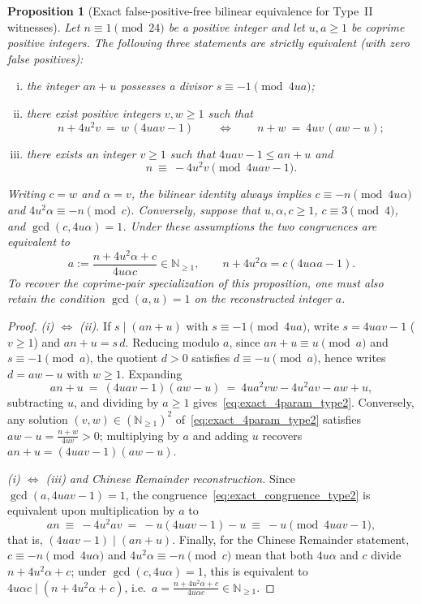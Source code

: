 \documentclass[11pt, a4paper]{article}
\theoremstyle{plain}
\newtheorem{proposition}[theorem]{Proposition}
\theoremstyle{definition}
\newcommand{\N}{\mathbb{N}}
\begin{document}
\begin{proposition}[Exact false-positive-free bilinear equivalence for Type~II witnesses]\label{prop:exact_bilinear_type2}\label{prop:exact_monomial_decoupling}
Let $n\equiv1\pmod{24}$ be a positive integer and let $u,a\ge1$ be coprime positive integers. The following three statements are strictly equivalent (with zero false positives):
\begin{enumerate}[(i)]
    \item the integer $an+u$ possesses a divisor $s\equiv-1\pmod{4ua}$;
    \item there exist positive integers $v,w\ge1$ such that
    \begin{equation}\label{eq:exact_4param_type2}
    n+4u^{2}v\ =\ w\,(4uav-1)\qquad\Longleftrightarrow\qquad n+w\ =\ 4uv\,(aw-u);
    \end{equation}
    \item there exists an integer $v\ge1$ such that $4uav-1\le an+u$ and
    \begin{equation}\label{eq:exact_congruence_type2}
    n\ \equiv\ -4u^{2}v\pmod{4uav-1}.
    \end{equation}
\end{enumerate}
Writing $c=w$ and $\alpha=v$, the bilinear identity always implies $c\equiv-n\pmod{4u\alpha}$ and $4u^{2}\alpha\equiv-n\pmod c$. Conversely, suppose that $u,\alpha,c\ge1$, $c\equiv3\pmod 4$, and $\gcd(c,4u\alpha)=1$. Under these assumptions the two congruences are equivalent to
\[
a:=\frac{n+4u^{2}\alpha+c}{4u\alpha c}\in\N_{\ge1},\qquad n+4u^{2}\alpha=c(4u\alpha a-1).
\]
To recover the coprime-pair specialization of this proposition, one must also retain the condition $\gcd(a,u)=1$ on the reconstructed integer $a$.
\end{proposition}
\begin{proof}
\emph{(i) $\Longleftrightarrow$ (ii).} If $s\mid(an+u)$ with $s\equiv-1\pmod{4ua}$, write $s=4uav-1$ ($v\ge1$) and $an+u=s\,d$. Reducing modulo $a$, since $an+u\equiv u\pmod a$ and $s\equiv-1\pmod a$, the quotient $d>0$ satisfies $d\equiv-u\pmod a$, hence writes $d=aw-u$ with $w\ge1$. Expanding
\[
an+u\ =\ (4uav-1)(aw-u)\ =\ 4ua^{2}vw-4u^{2}av-aw+u,
\]
subtracting $u$, and dividing by $a\ge1$ gives~\eqref{eq:exact_4param_type2}. Conversely, any solution $(v,w)\in(\N_{\ge1})^{2}$ of~\eqref{eq:exact_4param_type2} satisfies $aw-u=\frac{n+w}{4uv}>0$; multiplying by $a$ and adding $u$ recovers $an+u=(4uav-1)(aw-u)$.

\emph{(i) $\Longleftrightarrow$ (iii) and Chinese Remainder reconstruction.} Since $\gcd(a,4uav-1)=1$, the congruence~\eqref{eq:exact_congruence_type2} is equivalent upon multiplication by $a$ to
\[
an\ \equiv\ -4u^{2}av\ =\ -u(4uav-1)-u\ \equiv\ -u\pmod{4uav-1},
\]
that is, $(4uav-1)\mid(an+u)$. Finally, for the Chinese Remainder statement, $c\equiv-n\pmod{4u\alpha}$ and $4u^{2}\alpha\equiv-n\pmod c$ mean that both $4u\alpha$ and $c$ divide $n+4u^{2}\alpha+c$; under $\gcd(c,4u\alpha)=1$, this is equivalent to $4u\alpha c\mid(n+4u^{2}\alpha+c)$, i.e.\ $a=\frac{n+4u^{2}\alpha+c}{4u\alpha c}\in\N_{\ge1}$.
\end{proof}
\end{document}
